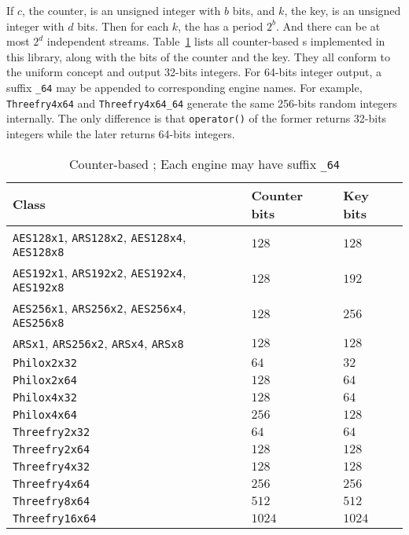 If $c$, the counter, is an unsigned integer with $b$ bits, and $k$, the key, is
an unsigned integer with $d$ bits. Then for each $k$, the \rng has a period
$2^b$. And there can be at most $2^d$ independent streams.
Table~\ref{tab:Counter-based RNG} lists all counter-based \rng{}s implemented
in this library, along with the bits of the counter and the key. They all
conform to the \cppoo uniform \rng concept and output 32-bits integers. For
64-bits integer output, a suffix \verb|_64| may be appended to corresponding
\rng engine names. For example, \verb|Threefry4x64| and \verb|Threefry4x64_64|
generate the same 256-bits random integers internally. The only difference is
that \verb|operator()| of the former returns 32-bits integers while the later
returns 64-bits integers.

\begin{table}
  \begin{tabularx}{\textwidth}{lXX}
    \toprule
    Class & Counter bits & Key bits \\
    \midrule
    \verb|AES128x1|, \verb|ARS128x2|, \verb|AES128x4|, \verb|AES128x8|
    & $128$  & $128$  \\
    \verb|AES192x1|, \verb|ARS192x2|, \verb|AES192x4|, \verb|AES192x8|
    & $128$  & $192$  \\
    \verb|AES256x1|, \verb|ARS256x2|, \verb|AES256x4|, \verb|AES256x8|
    & $128$  & $256$  \\
    \verb|ARSx1|, \verb|ARS256x2|, \verb|ARSx4|, \verb|ARSx8|
    & $128$  & $128$  \\
    \verb|Philox2x32|    & $64$   & $32$   \\
    \verb|Philox2x64|    & $128$  & $64$   \\
    \verb|Philox4x32|    & $128$  & $64$   \\
    \verb|Philox4x64|    & $256$  & $128$  \\
    \verb|Threefry2x32|  & $64$   & $64$   \\
    \verb|Threefry2x64|  & $128$  & $128$  \\
    \verb|Threefry4x32|  & $128$  & $128$  \\
    \verb|Threefry4x64|  & $256$  & $256$  \\
    \verb|Threefry8x64|  & $512$  & $512$  \\
    \verb|Threefry16x64| & $1024$ & $1024$ \\
    \bottomrule
  \end{tabularx}
  \caption{Counter-based \rng; Each \rng engine may have suffix \texttt{\_64}}
  \label{tab:Counter-based RNG}
\end{table}

